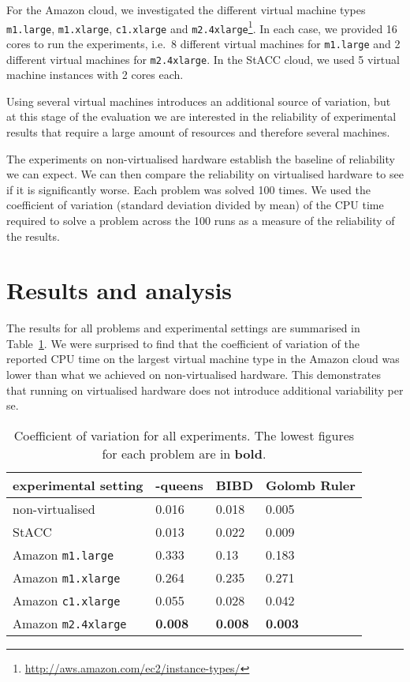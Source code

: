 \documentclass{llncs}
\begin{document}
For the Amazon cloud, we investigated the different virtual machine types
\texttt{m1.large}, \texttt{m1.xlarge}, \texttt{c1.xlarge} and
\texttt{m2.4xlarge}\footnote{\url{http://aws.amazon.com/ec2/instance-types/}}.
In each case, we provided 16 cores to run the experiments, i.e.\ 8 different
virtual machines for \texttt{m1.large} and 2 different virtual machines for
\texttt{m2.4xlarge}. In the StACC cloud, we used 5 virtual machine instances
with 2 cores each.

Using several virtual machines introduces an additional source of variation, but
at this stage of the evaluation we are interested in the reliability of
experimental results that require a large amount of resources and therefore
several machines.

The experiments on non-virtualised hardware establish the baseline of
reliability we can expect. We can then compare the reliability on virtualised
hardware to see if it is significantly worse. Each problem was solved 100 times.
We used the coefficient of variation (standard deviation divided by mean) of the
CPU time required to solve a problem across the 100 runs as a measure of the
reliability of the results.


\section{Results and analysis}

The results for all problems and experimental settings are summarised in
Table~\ref{res}. We were surprised to find that the coefficient of variation of
the reported CPU time on the largest virtual machine type in the Amazon cloud
was lower than what we achieved on non-virtualised hardware. This demonstrates
that running on virtualised hardware does not introduce additional variability
per se.

\begin{table}
\centering
\begin{tabular}{llll}
experimental setting & -queens & BIBD & Golomb Ruler\\\midrule
non-virtualised & 0.016 & 0.018 & 0.005\\
StACC & 0.013 & 0.022 & 0.009\\
Amazon \texttt{m1.large} & 0.333 & 0.13 & 0.183\\
Amazon \texttt{m1.xlarge} & 0.264 & 0.235 & 0.271\\
Amazon \texttt{c1.xlarge} & 0.055 & 0.028 & 0.042\\
Amazon \texttt{m2.4xlarge} & \textbf{0.008} & \textbf{0.008} & \textbf{0.003}\\
\end{tabular}
\caption{Coefficient of variation for all experiments. The lowest figures for
each problem are in \textbf{bold}.}
\label{res}
\end{table}
\end{document}
